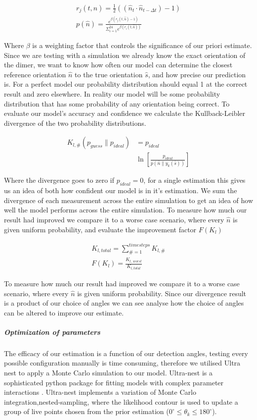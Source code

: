 \documentclass[final,3p, twocolumn]{elsarticle}
\begin{document}
\begin{align}
	r_j(t, \hat{n})= \frac{1}{2}((\hat{n}_{t} \cdot \hat{n}_{t-\Delta t})-1) \\
	p(\hat{n})= \frac{e^{\beta (r_j(t,\hat{n})-1)}}
	{\Sigma_{i=1}^{24}e^{\beta(r_i(t, \hat{n}))}}
\end{align}

Where $\beta$ is a weighting factor that controls the significance of our priori estimate. Since we are testing with a simulation we already know the exact orientation of the dimer, we want to know how often our model can determine the closest reference orientation $\hat{n}$ to the true orientation $\hat{s}$, and how precise our prediction is. For a perfect model our probability distribution should equal 1 at the correct result and zero elsewhere. In reality our model will be some probability distribution that has some probability of any orientation being correct. To evaluate our model's accuracy and confidence we calculate the Kullback-Leibler divergence of the two probability distributions. 

\begin{align}
	K_{l, \#}(p_{guess} \parallel p_{ideal}) &= 
	p_{ideal} \nonumber \\ 
	&\ln \left[\frac{p_{ideal}}{p(\hat{n}\parallel y_k(\hat{s}))}
	\right]
\end{align}

Where the divergence goes to zero if $p_{ideal}=0$, for a single estimation this gives us an idea of both how confident our model is in it's estimation. We sum the divergence of each measurement across the entire simulation to get an idea of how well the model performs across the entire simulation. To measure how much our result had improved we compare it to a worse case scenario, where every $\hat{n}$ is given uniform probability, and evaluate the improvement factor $F(K_l)$

\begin{align}
	K_{l,total} = \sum\limits_{\# =1}^{timesteps} K_{l,\#} \\
	F(K_l) = \frac{K_{l,\ worst}}{K_{l,total}}
\end{align}

To measure how much our result had improved we compare it to a worse case scenario, where every $\hat{n}$ is given uniform probability. Since our divergence result is a product of our choice of angles we can see analyse how the choice of angles can be altered to improve our estimate.  

\subparagraph{Optimization of parameters}
\label{2.2}
The efficacy of our estimation is a function of our detection angles, testing every possible configuration manually is time consuming, therefore we utilised Ultra nest to apply a Monte Carlo simulation to our model. Ultra-nest is a sophisticated python package for fitting models with complex parameter interactions \cite{Buchner2016Ultranest}. Ultra-nest implements a variation of Monte Carlo integration,nested-sampling, where the likelihood contour is used to update a group of live points chosen from the prior estimation ($0^{\circ} \leq \theta_k \leq 180^{\circ}$).
\end{document}
